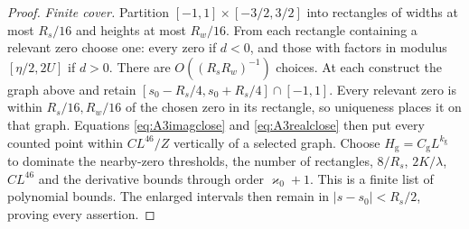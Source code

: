 \documentclass[11pt,reqno]{amsart}
\theoremstyle{definition}
\theoremstyle{remark}
\numberwithin{equation}{section}
\begin{document}
\begin{proof}
\emph{Finite cover.}
Partition $[-1,1]\times[-3/2,3/2]$ into rectangles of widths
at most $R_s/16$ and heights at most $R_w/16$. From each rectangle
containing a relevant zero choose one: every zero if $d<0$, and those
with factors in modulus $[\eta/2,2U]$ if $d>0$.
There are $O((R_sR_w)^{-1})$ choices. At each construct the graph above
and retain $[s_0-R_s/4,s_0+R_s/4]\cap[-1,1]$.
Every relevant zero is within $R_s/16,R_w/16$ of the chosen zero in
its rectangle, so uniqueness places it on that graph. Equations
\eqref{eq:A3imagclose} and \eqref{eq:A3realclose} then put every
counted point within $CL^{46}/Z$ vertically of a selected graph.
Choose $H_{\mathrm g}=C_{\mathrm g}L^{k_{\mathrm g}}$ to dominate the
nearby-zero thresholds, the number of rectangles, $8/R_s$, $2K/\lambda$,
$CL^{46}$ and the derivative bounds through order $\varkappa_0+1$.
This is a finite list of polynomial bounds. The enlarged intervals
then remain in $|s-s_0|<R_s/2$, proving every assertion.
\end{proof}
\end{document}
